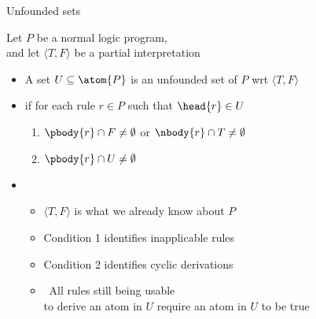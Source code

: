 \begin{frame}{Unfounded sets}

  Let $P$ be a normal logic program,\\ and
  let $\langle T,F \rangle$ be a partial interpretation
  \smallskip
  \begin{itemize}
  \item<2-> A set $U \subseteq \atom{P}$ is an \alert{unfounded set} of $P$
    wrt $\langle T,F \rangle$
  \item<4->[]
    if for each rule $r\in P$ such that $\head{r}\in U$

    \begin{enumerate}\normalsize
    \item<5-> $\pbody{r} \cap F \neq \emptyset$ or $\nbody{r} \cap T \neq \emptyset$
    \item<7-> $\pbody{r} \cap U \neq \emptyset$
    \end{enumerate}
    \medskip
  \item<3->  \
    \begin{itemize}\normalsize
    \item<3-> $\langle T,F \rangle$ is what we already know about $P$
    \item<6-> Condition 1 identifies inapplicable rules
    \item<8-> Condition 2 identifies cyclic derivations
      \smallskip
    \item<9->[]  \
    \alert{All rules still being usable\\ to derive an atom in $U$ require an atom in $U$ to be true}
  \end{itemize}
\end{itemize}
\end{frame}
